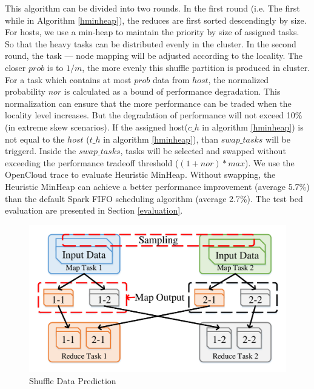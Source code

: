 This algorithm can be divided into two rounds. In the first round (i.e. The first while in Algorithm \ref{hminheap}), the reduces are first sorted descendingly by size. For hosts, we use a min-heap to maintain the priority by size of assigned tasks. So that the heavy tasks can be distributed evenly in the cluster.
In the second round, the task --- node mapping will be adjusted according to the locality. The closer $prob$ is to $1/m$, the more evenly this shuffle partition is produced in cluster. For a task which contains at most $prob$ data from $host$, the normalized probability $nor$ is calculated as a bound of performance degradation. This normalization can ensure that the more performance can be traded when the locality level increases. But the degradation of performance will not exceed 10\% (in extreme skew scenarios). If the assigned host($c\_h$ in algorithm \ref{hminheap}) is not equal to the $host$ ($t\_h$ in algorithm \ref{hminheap}), than $swap\_tasks$ will be triggerd. 
Inside the $swap\_tasks$, tasks will be selected and swapped without exceeding the performance tradeoff threshold ($\left(1+nor\right)*max$). We use the OpenCloud\cite{opencloudtrace} trace to evaluate Heuristic MinHeap. Without swapping, the Heuristic MinHeap can achieve a better performance improvement (average 5.7\%) than the default Spark FIFO scheduling algorithm (average 2.7\%). The test bed evaluation are presented in Section \ref{evaluation}.

\begin{figure}
	\centering
	\includegraphics[width=0.9\linewidth]{fig/shuffle}
	\caption{Shuffle Data Prediction}
	\label{fig:shuffle}
\end{figure}

